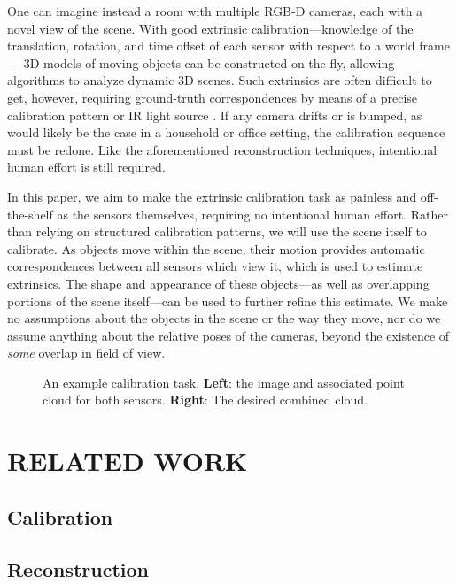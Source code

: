 \documentclass[letterpaper, 10 pt, conference]{ieeeconf}  %
\begin{document}
One can imagine instead a room with multiple RGB-D cameras, each with a novel view of the scene. With good 
extrinsic calibration---knowledge of the translation, rotation, and time offset of each sensor with respect to a world frame---
3D models of moving objects can be constructed on the fly, allowing algorithms to analyze dynamic 3D scenes. Such extrinsics 
are often difficult to get, however, requiring ground-truth correspondences by means of a precise calibration pattern 
\cite{checkerboard} or IR light source \cite{IRlight}. If any camera drifts or is bumped, as would likely be the case in 
a household or office setting, the calibration sequence must be redone. Like the aforementioned reconstruction techniques, 
intentional human effort is still required.

In this paper, we aim to make the extrinsic calibration task as painless and off-the-shelf as the sensors themselves, 
requiring no intentional human effort. Rather than relying on structured calibration patterns, 
we will use the scene itself to calibrate. As objects move within the scene, their motion provides automatic
correspondences between all sensors which view it, which is used to estimate extrinsics. 
The shape and appearance of these objects---as well as overlapping portions of the scene itself---can be used to further 
refine this estimate. We make no assumptions about the objects in the scene or the way they move, nor do we assume anything 
about the relative poses of the cameras, beyond the existence of \emph{some} overlap in field of view.


\begin{figure*}
  \centering
  \caption{An example calibration task. \textbf{Left}: the image and associated point cloud for both sensors. \textbf{Right}: The desired combined cloud.}
  \label{fig:example_alignment}
\end{figure*}

\section{RELATED WORK}
\cite{rubleeorb}
\subsection{Calibration}

\subsection{Reconstruction}
\end{document}

